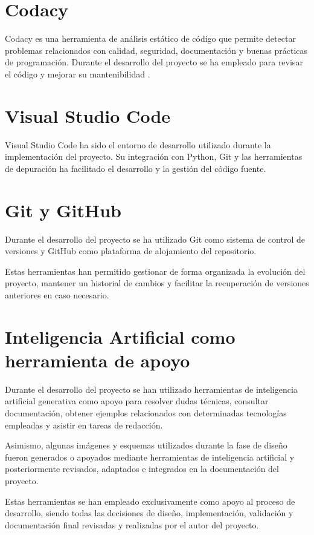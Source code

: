 \section{Codacy}

Codacy es una herramienta de análisis estático de código que permite detectar problemas relacionados con calidad, seguridad, documentación y buenas prácticas de programación. Durante el desarrollo del proyecto se ha empleado para revisar el código y mejorar su mantenibilidad \cite{codacy}.

\section{Visual Studio Code}

Visual Studio Code \cite{vscode} ha sido el entorno de desarrollo utilizado durante la implementación del proyecto. Su integración con Python, Git y las herramientas de depuración ha facilitado el desarrollo y la gestión del código fuente.

\section{Git y GitHub}

Durante el desarrollo del proyecto se ha utilizado Git como sistema de control de versiones y GitHub como plataforma de alojamiento del repositorio.

Estas herramientas han permitido gestionar de forma organizada la evolución del proyecto, mantener un historial de cambios y facilitar la recuperación de versiones anteriores en caso necesario.

\section{Inteligencia Artificial como herramienta de apoyo}

Durante el desarrollo del proyecto se han utilizado herramientas de inteligencia artificial generativa como apoyo para resolver dudas técnicas, consultar documentación, obtener ejemplos relacionados con determinadas tecnologías empleadas y asistir en tareas de redacción.

Asimismo, algunas imágenes y esquemas utilizados durante la fase de diseño fueron generados o apoyados mediante herramientas de inteligencia artificial y posteriormente revisados, adaptados e integrados en la documentación del proyecto.

Estas herramientas se han empleado exclusivamente como apoyo al proceso de desarrollo, siendo todas las decisiones de diseño, implementación, validación y documentación final revisadas y realizadas por el autor del proyecto.

